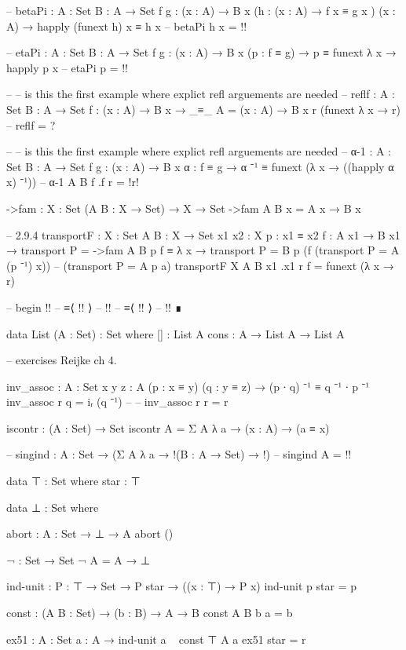 \documentclass[11pt, a4paper]{article}
\begin{document}
\begin{code}
  -- betaPi : {A : Set} {B : A → Set} {f g : (x : A) → B x} (h : (x : A) → f x ≡ g x ) (x : A) → happly (funext h) x ≡ h x
  -- betaPi h x = {!!}

  -- etaPi :  {A : Set} {B : A → Set} {f g : (x : A) → B x} (p : f ≡ g) → p ≡ funext λ x → happly p x
  -- etaPi p = {!!}

  -- -- is this the first example where explict refl arguements are needed
  -- reflf :  {A : Set} {B : A → Set} {f : (x : A) → B x} → _≡_ {A = (x : A) → B x} r (funext λ x → r)
  -- reflf = ?

  -- -- is this the first example where explict refl arguements are needed
  -- α-1 :  {A : Set} {B : A → Set} {f g : (x : A) → B x} {α : f ≡ g} → α ⁻¹ ≡ funext (λ x → ((happly α x) ⁻¹))
  -- α-1 {A} {B} {f} {.f} {r} = {!r!}

  ->fam : {X : Set} (A B : X → Set) → X → Set
  ->fam A B x = A x → B x

  -- 2.9.4
  transportF : {X : Set} {A B : X → Set} {x1 x2 : X} {p : x1 ≡ x2} {f : A x1 → B x1} →
               transport {P = ->fam A B} p f ≡  λ x → transport {P = B} p (f (transport {P = A} (p ⁻¹) x))
               -- (transport {P = A} p a)
  transportF {X} {A} {B} {x1} {.x1} {r} {f} = funext (λ x → r)

  -- begin {!!}
  -- ≡⟨ {!!} ⟩
  -- {!!}
  -- ≡⟨ {!!} ⟩
  -- {!!} ∎

  data List (A : Set) : Set where
    [] : List A
    cons : A → List A → List A

  -- exercises Reijke ch 4.

  inv_assoc : {A : Set} {x y z : A} (p : x ≡ y) (q : y ≡ z) → (p ∙ q) ⁻¹ ≡ q ⁻¹ ∙ p ⁻¹
  inv_assoc r q = iᵣ (q ⁻¹)
  -- -- inv_assoc r r = r


  iscontr : (A : Set) → Set
  iscontr A =  Σ A λ a → (x : A) → (a ≡ x)

  -- singind : {A : Set} → (Σ A λ a → {!(B : A → Set) → !})
  -- singind {A} = {!!}

  data ⊤ : Set where
    star  : ⊤

  data ⊥ : Set where

  abort : {A : Set} → ⊥ → A
  abort ()

  ¬ : Set → Set
  ¬ A = A → ⊥

  ind-unit :  {P : ⊤ → Set} → P star → ((x : ⊤) → P x)
  ind-unit p star = p

  const :  (A B : Set) → (b : B) → A → B
  const A B b a = b 

  ex51 :  {A : Set} {a : A} → ind-unit a ~ const ⊤ A a
  ex51 star = r


\end{code}
\end{document}
